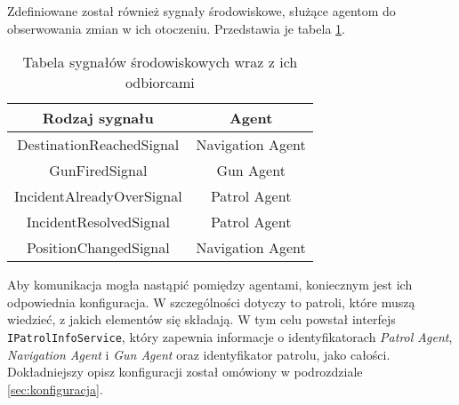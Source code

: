 \par Zdefiniowane został również sygnały środowiskowe, służące agentom do obserwowania zmian w ich otoczeniu. Przedstawia je tabela \ref{tab:agentsEnvironmentSignals}.

\begin{table}
    \centering
    \begin{tabular}{|c|c|} 
     \hline
     Rodzaj sygnału & Agent \\
     \hline
     \hline
     DestinationReachedSignal & Navigation Agent \\ 
     \hline
     GunFiredSignal & Gun Agent \\ 
     \hline
     IncidentAlreadyOverSignal & Patrol Agent \\ 
     \hline
     IncidentResolvedSignal & Patrol Agent \\ 
     \hline
     PositionChangedSignal & Navigation Agent \\ 
     \hline
    \end{tabular}
    \caption{Tabela sygnałów środowiskowych wraz z ich odbiorcami}
    \label{tab:agentsEnvironmentSignals}
\end{table}

\par Aby komunikacja mogła nastąpić pomiędzy agentami, koniecznym jest ich odpowiednia konfiguracja. W szczególności dotyczy to patroli, które muszą wiedzieć, z jakich elementów się składają. W tym celu powstał interfejs \texttt{IPatrolInfoService}, który zapewnia informacje o identyfikatorach \emph{Patrol Agent}, \emph{Navigation Agent} i \emph{Gun Agent} oraz identyfikator patrolu, jako całości. Dokładniejszy opisz konfiguracji został omówiony w podrozdziale \ref{sec:konfiguracja}.